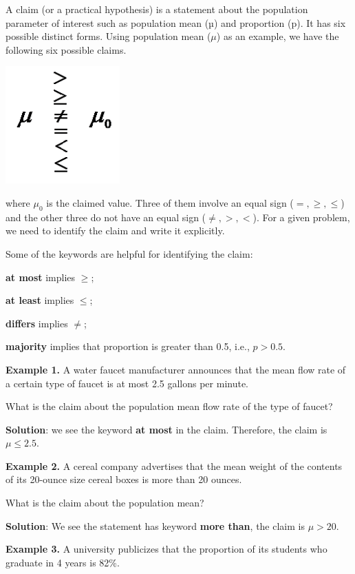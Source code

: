 \documentclass[
]{book}
\begin{document}
A claim (or a practical hypothesis) is a statement about the population parameter of interest such as population mean (µ) and proportion (p). It has six possible distinct forms. Using population mean (\(\mu\)) as an example, we have the following six possible claims.

\begin{center}\includegraphics[width=0.15\linewidth]{week08/possibleClaims} \end{center}

where \(\mu_0\) is the claimed value. Three of them involve an equal sign (\(=, \ge, \le\)) and the other three do not have an equal sign (\(\ne, >, <\)). For a given problem, we need to identify the claim and write it explicitly.

Some of the keywords are helpful for identifying the claim:

\textbf{at most} implies \(\ge\);

\textbf{at least} implies \(\le\);

\textbf{differs} implies \(\ne\);

\textbf{majority} implies that proportion is greater than 0.5, i.e., \(p > 0.5\).

\hfill\break

\textbf{Example 1. } A water faucet manufacturer announces that the mean flow rate of a certain type of faucet is at most 2.5 gallons per minute.

What is the claim about the population mean flow rate of the type of faucet?

\textbf{Solution}: we see the keyword \textbf{at most} in the claim. Therefore, the claim is \(\mu \le 2.5\).

\hfill\break

\textbf{Example 2. } A cereal company advertises that the mean weight of the contents of its 20-ounce size cereal boxes is more than 20 ounces.

What is the claim about the population mean?

\textbf{Solution}: We see the statement has keyword \textbf{more than}, the claim is \(\mu > 20\).

\hfill\break

\textbf{Example 3. } A university publicizes that the proportion of its students who graduate in 4 years is 82\%.
\end{document}
